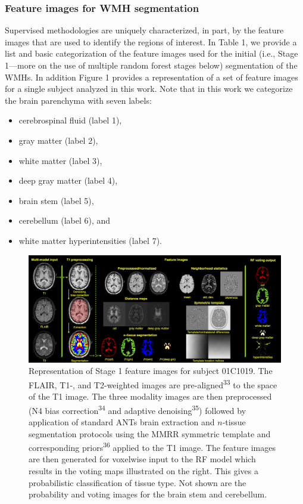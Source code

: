 \documentclass[11pt,]{article}
\providecommand{\tightlist}{%
  \setlength{\itemsep}{0pt}\setlength{\parskip}{0pt}}
\begin{document}
\subsubsection{Feature images for WMH
segmentation}\label{feature-images-for-wmh-segmentation}



Supervised methodologies are uniquely characterized, in part, by the
feature images that are used to identify the regions of interest. In
Table 1, we provide a list and basic categorization of the feature
images used for the initial (i.e., Stage 1---more on the use of multiple
random forest stages below) segmentation of the WMHs. In addition Figure
1 provides a representation of a set of feature images for a single
subject analyzed in this work. Note that in this work we categorize the
brain parenchyma with seven labels:

\begin{itemize}
\tightlist
\item
  cerebrospinal fluid (label 1),
\item
  gray matter (label 2),
\item
  white matter (label 3),
\item
  deep gray matter (label 4),
\item
  brain stem (label 5),
\item
  cerebellum (label 6), and
\item
  white matter hyperintensities (label 7).
\end{itemize}

\begin{figure}[htbp]
\centering
\includegraphics{Figures/featureImages.png}
\caption{Representation of Stage 1 feature images for subject 01C1019.
The FLAIR, T1-, and T2-weighted images are
 pre-aligned\textsuperscript{33} to
the space of the T1 image. The three modality images are then
preprocessed (N4 bias correction\textsuperscript{34} and adaptive
denoising\textsuperscript{35}) followed by application of standard ANTs
brain extraction and \(n\)-tissue segmentation protocols using the MMRR
symmetric template and corresponding priors\textsuperscript{36} applied
to the T1 image. The feature images are then generated for voxelwise
input to the RF model which results in the voting maps illustrated on
the right. This gives a probabilistic classification of tissue type. Not
shown are the probability and voting images for the brain stem and
cerebellum.}
\end{figure}
\end{document}
